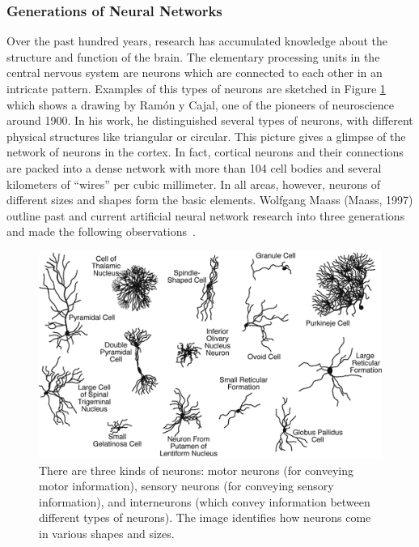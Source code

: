 \subsubsection{Generations of Neural Networks}
Over the past hundred years, research has accumulated knowledge about the structure and function of the brain. The elementary processing units in the central nervous system are neurons which are connected to each other in an intricate pattern. Examples of this types of neurons are sketched in Figure \ref{fig:NeuronTypes} which shows a drawing by Ram\'on y Cajal, one of the pioneers of neuroscience around 1900. In his work, he distinguished several types of neurons, with different physical structures like triangular or circular. This picture gives a glimpse of the network of neurons in the cortex. In fact, cortical neurons and their connections are packed into a dense network with more than 104 cell bodies and several kilometers of ``wires'' per cubic millimeter. In all areas, however, neurons of different sizes and shapes form the basic elements. Wolfgang Maass (Maass, 1997) outline past and current artificial neural network research into three generations and made the following observations~\cite{Maass1996}.

\begin{figure}[ht]
    \centering
    \includegraphics[scale=0.7]{images/Figure1Neuron_Types.png}
    \caption[Types of neurons]{\small{There are three kinds of neurons: motor neurons (for conveying motor information), sensory neurons (for conveying sensory information), and interneurons (which convey information between different types of neurons). The image identifies how neurons come in various shapes and sizes.}}
    \label{fig:NeuronTypes}
\end{figure}

